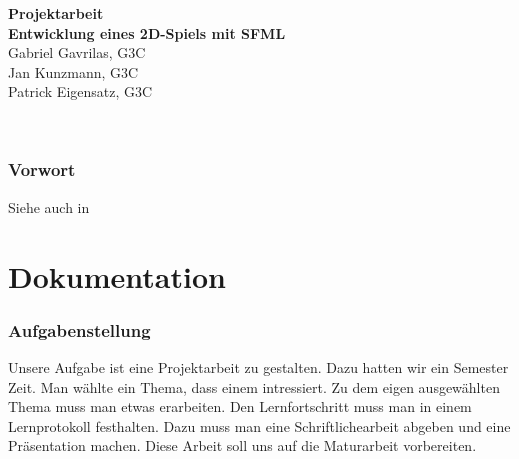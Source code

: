 \documentclass[12pt,a4paper]{scrartcl}
\begin{document}
\begin{titlepage}
\begin{center}

\vspace*{3cm}
\textbf{\huge{Projektarbeit}}\\
\vspace*{2cm}
\textbf{\large{Entwicklung eines 2D-Spiels mit SFML}}\\
\vspace*{5cm}
Gabriel Gavrilas, G3C\\
Jan Kunzmann, G3C\\
Patrick Eigensatz, G3C
\end{center}
\end{titlepage}


\clearpage
\newpage
\mbox{ }
\clearpage

\setcounter{page}{1}
\section*{Vorwort}
Siehe auch in \cite{grundkurscpp}

\newpage

\tableofcontents

\newpage
\part{Dokumentation}
\section{Aufgabenstellung} 
Unsere Aufgabe ist eine Projektarbeit zu gestalten. Dazu hatten wir ein Semester Zeit. Man wählte ein Thema, dass einem intressiert. 
Zu dem eigen ausgewählten Thema muss man etwas erarbeiten. Den Lernfortschritt muss man in einem Lernprotokoll festhalten.
Dazu muss man eine Schriftlichearbeit abgeben und eine Präsentation machen. Diese Arbeit soll uns auf die Maturarbeit
vorbereiten.
\end{document}
